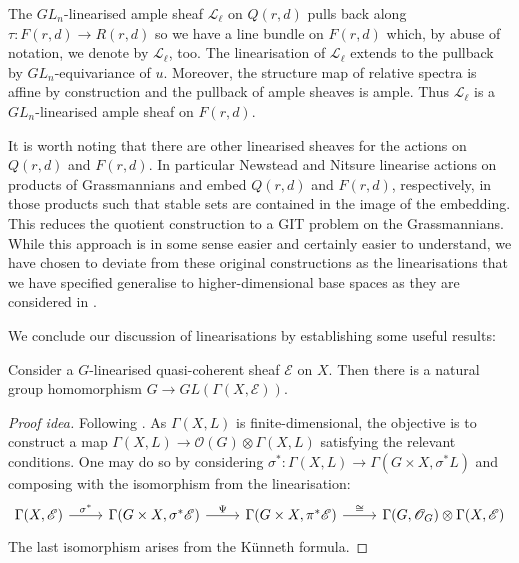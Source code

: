 \documentclass[12pt]{ociamthesis}  %
\begin{document}
\begin{example}
  The $GL_n$-linearised ample sheaf $\mathscr L_\ell$ on
  $Q(r,d)$ pulls back along $\tau:F(r,d)\to R(r,d)$ so
  we have a line bundle on $F(r,d)$ which, by abuse of
  notation, we denote by $\mathscr L_\ell$, too. The
  linearisation of $\mathscr L_\ell$ extends to the pullback by
  $GL_n$-equivariance of $u$. Moreover, the structure
  map of relative spectra is affine by construction and the
  pullback of ample sheaves is ample. Thus $\mathscr L_\ell$
  is a $GL_n$-linearised ample sheaf on $F(r,d)$.
\end{example}

It is worth noting that there are other linearised sheaves for
the actions on $Q(r,d)$ and $F(r,d)$.  In particular
Newstead \cite{newstead1978} and Nitsure \cite{nitsure1991} linearise
actions on products of Grassmannians and embed $Q(r,d)$ and $F(r,d)$,
respectively, in those products such that stable sets are contained
in the image of the embedding. This reduces the quotient construction
to a GIT problem on the Grassmannians. While this approach is in
some sense easier and certainly easier to understand, we have
chosen to deviate from these original constructions as the linearisations
that we have specified generalise to higher-dimensional base spaces
as they are considered in \cite{huybrechts2010}.

We conclude our discussion of linearisations by establishing
some useful results:

\begin{lemma}\label{lem:linearisations_give_reps}
  Consider a $G$-linearised quasi-coherent sheaf $\mathscr E$ on $X$.
  Then there is a natural group homomorphism $G\to GL(\Gamma(X,\mathscr E))$.
  \begin{proof}[Proof idea]
    Following \cite[Lemma 5.19]{hoskins2016}. As $\Gamma(X,L)$
    is finite-dimensional, the objective is to construct a map
    $\Gamma(X,L) \to \mathscr O(G) \otimes \Gamma(X,L)$
    satisfying the relevant conditions. One may do so by considering
    $\sigma^* : \Gamma(X,L) \to \Gamma(G\times X,\sigma^*L)$ and
    composing with the isomorphism from the linearisation:
    \begin{equation*}
      \begin{tikzcd}
        {\Gamma(X,\mathscr E)} & {\Gamma(G\times X,\sigma^*\mathscr E)} & {\Gamma(G\times X,\pi^*\mathscr E)} & {\Gamma(G,\mathscr O_G)\otimes\Gamma(X,\mathscr E)}
        \arrow["{\sigma^*}", from=1-1, to=1-2]
        \arrow["\Psi", from=1-2, to=1-3]
        \arrow["\cong", from=1-3, to=1-4]
      \end{tikzcd}
    \end{equation*}
    The last isomorphism arises from the K\"unneth formula.
  \end{proof}
\end{lemma}
\end{document}
